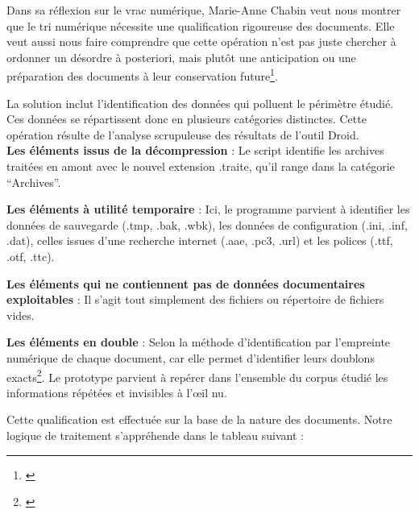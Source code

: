 Dans sa réflexion sur le vrac numérique, Marie-Anne Chabin veut nous montrer que le tri numérique nécessite une qualification rigoureuse des documents. Elle veut aussi nous faire comprendre que cette opération n'est pas juste chercher à ordonner un désordre à posteriori, mais plutôt une anticipation ou une préparation des documents à leur conservation future\footnote{\cite{chabin-vrac-2016}}.

La solution inclut l'identification des données qui polluent le périmètre étudié. Ces données se répartissent donc en plusieurs catégories distinctes. Cette opération résulte de l'analyse scrupuleuse des résultats de l'outil Droid.\\[0.1cm]

\textbf{Les éléments issus de la décompression} : Le script identifie les archives traitées en amont avec le nouvel extension .traite, qu'il range dans la catégorie \enquote{Archives}.

\textbf{Les éléments à utilité temporaire} : Ici, le programme parvient à identifier les données de sauvegarde (.tmp, .bak, .wbk), les données de configuration (.ini, .inf, .dat), celles issues d'une recherche internet (.aae, .pc3, .url) et les polices (.ttf, .otf, .ttc).

\textbf{Les éléments qui ne contiennent pas de données documentaires exploitables} : Il s'agit tout simplement des fichiers ou répertoire de fichiers vides.

\textbf{Les éléments en double} : Selon la méthode d'identification par l'empreinte numérique de chaque document, car elle permet d'identifier leurs doublons exacts\footnote{\cite{bnf_integrite_donnees_numeriques}}. Le prototype parvient à repérer dans l'ensemble du corpus étudié les informations répétées et invisibles à l’œil nu.

Cette qualification est effectuée sur la base de la nature des documents. Notre logique de traitement s'appréhende dans le tableau suivant : 

\begin{table}[h]
	\centering
	\renewcommand{\arraystretch}{1.5}
	\setlength{\tabcolsep}{10pt}
	\caption{Présentation des catégories de données triées}
	\label{tab:categories_tri}
\end{table}


